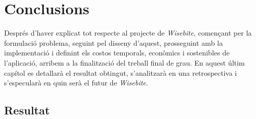 
\chapter{Conclusions} %

\label{Chapter12} %

Després d'haver explicat tot respecte al projecte de \textit{Wisebite}, començant per la formulació problema, seguint pel disseny d'aquest, prosseguint amb la implementació i definint els costos temporals, econòmics i sostenibles de l'aplicació, arribem a la finalització del treball final de grau. En aquest últim capítol es detallarà el resultat obtingut, s'analitzarà en una retrospectiva i s'especularà en quin serà el futur de \textit{Wisebite}.


\section{Resultat}

